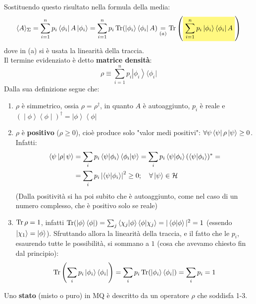\documentclass[../../FisicaTeorica.tex]{subfiles}
\begin{document}
Sostituendo questo risultato nella formula della media:
\[
\langle A \rangle_\Sigma = \sum_{i=1}^n p_i \bra{\phi_i}A\ket{\phi_i} = \sum_{i=1}^n p_i \op{Tr}(\ket{\phi_i}\bra{\phi_i}A) \underset{(a)}{=} \op{Tr}\left( \hlc{Yellow}{\sum_{i=1}^n p_i \ket{\phi_i}\bra{\phi_i}A}\right )
\]
dove in (a) si è usata la linearità della traccia.\\
Il termine evidenziato è detto \textbf{matrice densità}:
\[
\rho \equiv \sum_{i=1}^{n}{p_i\left|\phi_i\right\rangle\langle\phi_i|}
\]
Dalla sua definizione segue che: 
\begin{enumerate}
    \item $\rho$ è simmetrico, ossia $\displaystyle \rho = \rho^\dag$, in quanto $A$ è autoaggiunto, $p_i$ è reale e $\left(\middle|\phi\right\rangle{\left\langle\phi\middle|\right)}^\dag=\left|\phi\right\rangle\left\langle\phi\right|$
	\item $\rho$ è \textbf{positivo} ($\rho \geq 0$), cioè produce solo "valor medi positivi": $\forall \psi \left\langle\psi\right|\rho \ket{\psi}\geq 0$. Infatti:
	\begin{align*}
	    \left\langle\psi\left|\rho\right|\psi\right\rangle&=\sum_{i}p_i\left\langle\psi\middle|\phi_i\right\rangle\left\langle\phi_i\middle|\psi\right\rangle=
	    \sum_i p_i \braket{\psi|\phi_i}(\braket{\psi|\phi_i})^* =
	    \\
	    &=\sum_{i}p_i\left|\left\langle\psi\middle|\phi_i\right\rangle\right|^2\geq0; \quad \forall \ket{\psi}\in \mathcal{H}
	\end{align*}
	(Dalla positività si ha poi subito che è autoaggiunto, come nel caso di un numero complesso, che è positivo solo se reale)
	\item $\displaystyle \operatorname{Tr}\rho = 1$, infatti  $\operatorname{Tr}(\ket{\phi}\bra{\phi}) = \sum_j \braket{\chi_j|\phi}\braket{\phi|\chi_j} = |\braket{\phi|\phi}|^2 = 1$ (essendo $\ket{\chi_1} = \ket{\phi}$). Sfruttando allora la linearità della traccia, e il fatto che le $p_i$, esaurendo tutte le possibilità, si sommano a $1$ (cosa che avevamo chiesto fin dal principio):
	\[
	\operatorname{Tr}\left(\sum_i p_i \ket{\phi_i}\bra{\phi_i}\right) = \sum_i p_i \operatorname{Tr}(\ket{\phi_i}\bra{\phi_i}) = \sum_i p_i = 1
	\]
\end{enumerate}
\begin{dfn}
Uno \textbf{stato} (misto o puro) in MQ è descritto da un operatore $\rho$ che soddisfa 1-3.
\end{dfn}
\end{document}
